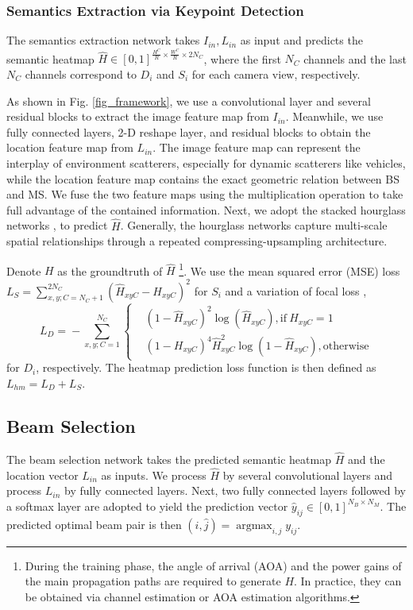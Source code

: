\documentclass[lettersize,journal]{IEEEtran}
\begin{document}
\subsubsection{Semantics Extraction via Keypoint Detection}
The semantics extraction network takes $I_{in}, L_{in}$ as input and predicts the semantic heatmap $\hat{H} \in [0, 1]^{\frac{H^C}{R}\times\frac{W^C}{R}\times2N_C}$, where the first $N_C$ channels and the last $N_C$ channels correspond to $D_i$ and $S_i$ for each camera view, respectively.

As shown in Fig. \ref{fig_framework}, we use a convolutional layer and several residual blocks \cite{resnet} to extract the image feature map from $I_{in}$. Meanwhile, we use fully connected layers, 2-D reshape layer, and residual blocks to obtain the location feature map from $L_{in}$.
The image feature map can represent the interplay of environment scatterers, especially for dynamic scatterers like vehicles, while the location feature map contains the exact geometric relation between BS and MS.
We fuse the two feature maps using the multiplication operation to take full advantage of the contained information. 
Next, we adopt the stacked hourglass networks \cite{hourglass}, \cite{hourglass2} to predict $\hat{H}$. Generally, the hourglass networks capture multi-scale spatial relationships through a repeated compressing-upsampling architecture.

Denote $H$ as the groundtruth of $\hat{H}$ \footnote{During the training phase, the angle of arrival (AOA) and the power gains of the main propagation paths are required to generate $H$. In practice, they can be obtained via channel estimation or AOA estimation algorithms.}.
We use the {mean squared error (MSE)} loss $L_S= \sum_{x,y;C=N_C+1}^{2N_C} (\hat{H}_{xyC} - H_{xyC})^2$ for $S_i$ and a variation of focal loss \cite{cornernet}, \cite{centernet}
\begin{equation}
  L_D\!=\!-\!\!\!\!\!\sum_{x,y;C=1}^{N_C} \!\!\!
  \left\{
  \begin{aligned}
    &(1-\hat{H}_{xyC})^2\log(\hat{H}_{xyC}), \text{if} \ H_{xyC}=1\\
    &(1-H_{xyC})^4\hat{H}_{xyC}^2\log(1 - \hat{H}_{xyC}), \text{otherwise}
  \end{aligned}
  \right.
\end{equation}
for $D_i$, respectively. The heatmap prediction loss function is then defined as $L_{hm} = L_D + L_S$. 

\subsection{Beam Selection}
The beam selection network takes the predicted semantic heatmap $\hat{H}$ and the location vector $L_{in}$ as inputs.
We process $\hat{H}$ by several convolutional layers and process $L_{in}$ by fully connected layers. Next, two fully connected layers followed by a softmax layer are adopted to yield the prediction vector $\hat{y}_{ij} \in [0, 1]^{N_B\times N_M}$. The predicted optimal beam pair is then $(\hat{i}, \hat{j}) = \mathop{\arg\max}_{i, j} y_{ij}$.
\end{document}
